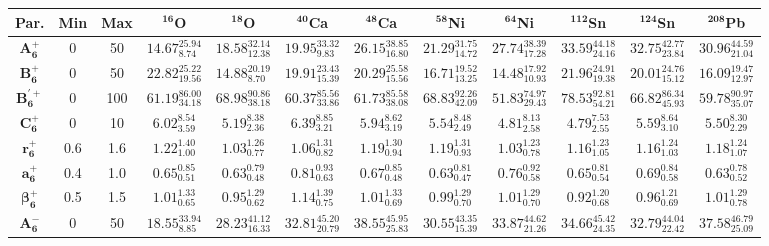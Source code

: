 \bgroup
\def\arraystretch{1.5}%
\begin{tabular}{ c c c c c c c c c c c c} 
\textbf{Par.} & \textbf{Min} & \textbf{Max} & \textbf{$\mathbf{^{16}}$O}& \textbf{$\mathbf{^{18}}$O}& \textbf{$\mathbf{^{40}}$Ca}& \textbf{$\mathbf{^{48}}$Ca}& \textbf{$\mathbf{^{58}}$Ni}& \textbf{$\mathbf{^{64}}$Ni}& \textbf{$\mathbf{^{112}}$Sn}& \textbf{$\mathbf{^{124}}$Sn}& \textbf{$\mathbf{^{208}}$Pb}\\
 \hline 
$\mathbf{A_{6}^{+}}$ & 0 & 50 & $14.67^{25.94}_{8.74}$ & $18.58^{32.14}_{12.38}$ & $19.95^{33.32}_{9.83}$ & $26.15^{38.85}_{16.80}$ & $21.29^{31.75}_{14.72}$ & $27.74^{38.39}_{17.28}$ & $33.59^{44.18}_{24.16}$ & $32.75^{42.77}_{23.84}$ & $30.96^{44.59}_{21.04}$\\ 
$\mathbf{B_{6}^{+}}$ & 0 & 50 & $22.82^{25.22}_{19.56}$ & $14.88^{20.19}_{8.70}$ & $19.91^{23.43}_{15.39}$ & $20.29^{25.58}_{15.56}$ & $16.71^{19.52}_{13.25}$ & $14.48^{17.92}_{10.93}$ & $21.96^{24.91}_{19.38}$ & $20.01^{24.76}_{15.12}$ & $16.09^{19.47}_{12.97}$\\ 
$\mathbf{B_{6}^{'+}}$ & 0 & 100 & $61.19^{86.00}_{34.18}$ & $68.98^{90.86}_{38.18}$ & $60.37^{85.56}_{33.86}$ & $61.73^{85.58}_{38.08}$ & $68.83^{92.26}_{42.09}$ & $51.83^{74.97}_{29.43}$ & $78.53^{92.81}_{54.21}$ & $66.82^{86.34}_{45.93}$ & $59.78^{90.97}_{35.07}$\\ 
$\mathbf{C_{6}^{+}}$ & 0 & 10 & $6.02^{8.54}_{3.59}$ & $5.19^{8.38}_{2.36}$ & $6.39^{8.85}_{3.21}$ & $5.94^{8.62}_{3.19}$ & $5.54^{8.48}_{2.49}$ & $4.81^{8.13}_{2.58}$ & $4.79^{7.53}_{2.55}$ & $5.59^{8.64}_{3.10}$ & $5.50^{8.30}_{2.29}$\\ 
$\mathbf{r_{6}^{+}}$ & 0.6 & 1.6 & $1.22^{1.40}_{1.00}$ & $1.03^{1.26}_{0.77}$ & $1.06^{1.31}_{0.82}$ & $1.19^{1.30}_{0.94}$ & $1.19^{1.31}_{0.93}$ & $1.03^{1.23}_{0.78}$ & $1.16^{1.23}_{1.05}$ & $1.16^{1.24}_{1.03}$ & $1.18^{1.24}_{1.07}$\\ 
$\mathbf{a_{6}^{+}}$ & 0.4 & 1.0 & $0.65^{0.85}_{0.51}$ & $0.63^{0.79}_{0.48}$ & $0.81^{0.93}_{0.63}$ & $0.67^{0.85}_{0.48}$ & $0.63^{0.81}_{0.47}$ & $0.76^{0.92}_{0.58}$ & $0.65^{0.81}_{0.54}$ & $0.69^{0.84}_{0.58}$ & $0.63^{0.78}_{0.52}$\\ 
$\mathbf{\beta_{6}^{+}}$ & 0.5 & 1.5 & $1.01^{1.33}_{0.65}$ & $0.95^{1.29}_{0.62}$ & $1.14^{1.39}_{0.75}$ & $1.01^{1.33}_{0.69}$ & $0.99^{1.29}_{0.70}$ & $1.01^{1.29}_{0.70}$ & $0.92^{1.20}_{0.68}$ & $0.96^{1.21}_{0.69}$ & $1.01^{1.29}_{0.78}$\\ 
$\mathbf{A_{6}^{-}}$ & 0 & 50 & $18.55^{33.94}_{8.85}$ & $28.23^{41.12}_{16.33}$ & $32.81^{45.20}_{20.79}$ & $38.55^{45.95}_{25.83}$ & $30.55^{43.35}_{15.39}$ & $33.87^{44.62}_{21.26}$ & $34.66^{45.42}_{24.35}$ & $32.79^{44.04}_{22.42}$ & $37.58^{46.79}_{25.09}$\\ 

\end{tabular}
